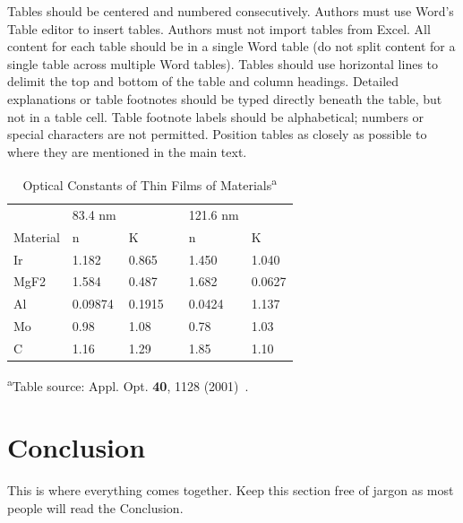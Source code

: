 \documentclass{osa-article}
\begin{document}
Tables should be centered and numbered consecutively. Authors must use Word’s Table editor to insert tables. Authors must not import tables from Excel. All content for each table should be in a single Word table (do not split content for a single table across multiple Word tables). Tables should use horizontal lines to delimit the top and bottom of the table and column headings. Detailed explanations or table footnotes should be typed directly beneath the table, but not in a table cell. Table footnote labels should be alphabetical; numbers or special characters are not permitted. Position tables as closely as possible to where they are mentioned in the main text.

\begin{table}[ht]
\centering
\footnotesize
    \begin{threeparttable}
    \caption{Optical Constants of Thin Films of Materials\textsuperscript{a}}
    \label{tab:optical}
        \begin{tabular}{@{}llllll@{}}
            \toprule
                     & 83.4 nm &        &  & 121.6 nm &        \\ \cmidrule(lr){2-3} \cmidrule(l){5-6} 
            Material & n       & K      &  & n        & K      \\ \midrule
            Ir       & 1.182   & 0.865  &  & 1.450    & 1.040  \\
            MgF2     & 1.584   & 0.487  &  & 1.682    & 0.0627 \\
            Al       & 0.09874 & 0.1915 &  & 0.0424   & 1.137  \\
            Mo       & 0.98    & 1.08   &  & 0.78     & 1.03   \\
            C        & 1.16    & 1.29   &  & 1.85     & 1.10   \\ \bottomrule
        \end{tabular}
        \begin{tablenotes}
            \item \textsuperscript{a}Table source: Appl. Opt. \textbf{40}, 1128 (2001)~\cite{larruquert2001multilayer}.
        \end{tablenotes}
    \end{threeparttable}
\end{table}

\section{Conclusion}
This is where everything comes together. Keep this section free of jargon as most people will read the Conclusion.


\end{document}
